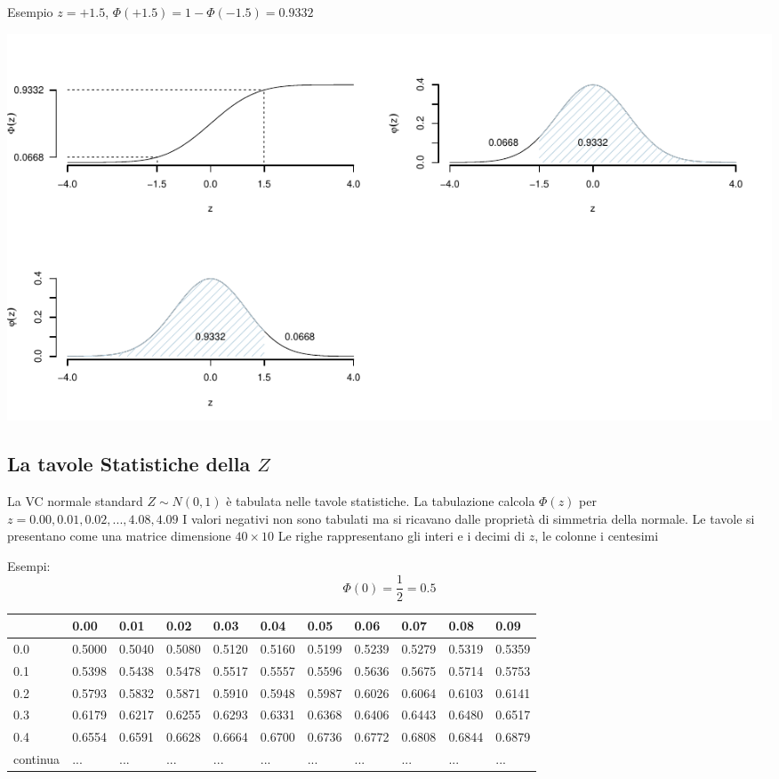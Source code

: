 \documentclass[
  11pt,
]{book}
\theoremstyle{mytheoremstyle}
\theoremstyle{mydefstyle}
\begin{document}
Esempio \(z=+1.5\), \(\Phi(+1.5)=1-\Phi(-1.5)=0.9332\)

\begin{center}\includegraphics{Appunti_di_Statistica_2025_files/figure-latex/07c-Normale-11,-1} \end{center}

\subsection{\texorpdfstring{La tavole Statistiche della \(Z\)}{La tavole Statistiche della Z}}\label{la-tavole-statistiche-della-z}

La VC normale standard \(Z\sim N(0,1)\) è tabulata nelle tavole statistiche.
La tabulazione calcola \(\Phi(z)\) per \(z=0.00, 0.01,0.02,...,4.08,4.09\)
I valori negativi non sono tabulati ma si ricavano dalle proprietà di simmetria della normale.
Le tavole si presentano come una matrice dimensione \(40\times 10\)
Le righe rappresentano gli interi e i decimi di \(z\), le colonne i centesimi

Esempi: \[\Phi(0)=\frac 1 2 = 0.5\]

\begin{tabular}{l|>{}l|lllllllll}
\toprule
  & 0.00 & 0.01 & 0.02 & 0.03 & 0.04 & 0.05 & 0.06 & 0.07 & 0.08 & 0.09\\
\midrule
\textcolor[HTML]{AB292E}{0.0} & \textcolor[HTML]{AB292E}{0.5000} & \textcolor[HTML]{AB292E}{0.5040} & \textcolor[HTML]{AB292E}{0.5080} & \textcolor[HTML]{AB292E}{0.5120} & \textcolor[HTML]{AB292E}{0.5160} & \textcolor[HTML]{AB292E}{0.5199} & \textcolor[HTML]{AB292E}{0.5239} & \textcolor[HTML]{AB292E}{0.5279} & \textcolor[HTML]{AB292E}{0.5319} & \textcolor[HTML]{AB292E}{0.5359}\\
\midrule
0.1 & \textcolor[HTML]{AB292E}{0.5398} & 0.5438 & 0.5478 & 0.5517 & 0.5557 & 0.5596 & 0.5636 & 0.5675 & 0.5714 & 0.5753\\
0.2 & \textcolor[HTML]{AB292E}{0.5793} & 0.5832 & 0.5871 & 0.5910 & 0.5948 & 0.5987 & 0.6026 & 0.6064 & 0.6103 & 0.6141\\
0.3 & \textcolor[HTML]{AB292E}{0.6179} & 0.6217 & 0.6255 & 0.6293 & 0.6331 & 0.6368 & 0.6406 & 0.6443 & 0.6480 & 0.6517\\
0.4 & \textcolor[HTML]{AB292E}{0.6554} & 0.6591 & 0.6628 & 0.6664 & 0.6700 & 0.6736 & 0.6772 & 0.6808 & 0.6844 & 0.6879\\
continua & \textcolor[HTML]{AB292E}{...} & ... & ... & ... & ... & ... & ... & ... & ... & ...\\
\bottomrule
\end{tabular}
\end{document}
